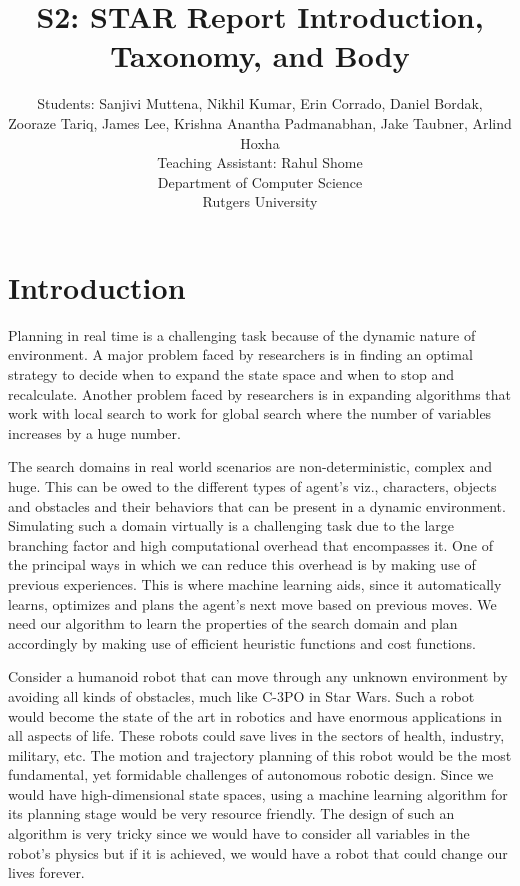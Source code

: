 \documentclass[tog]{acmsiggraph}
\title{S2: STAR Report Introduction, Taxonomy, and Body}
\author{Students: %
 Sanjivi Muttena\emailfoot{sanjivi.muttena@rutgers.edu}, %
 Nikhil Kumar\emailfoot{nikhilkumar516@gmail.com}, %
 Erin Corrado\emailfoot{e.corrado144@gmail.com}, %
 Daniel Bordak\emailfoot{dbordak@fastmail.fm},%
 \\Zooraze Tariq\emailfoot{zooraze@gmail.com}, %
 James Lee\emailfoot{yl50@scarletmail.rutgers.edu}, %
 Krishna Anantha Padmanabhan\emailfoot{krishna.ananth@rutgers.edu}, %
 Jake Taubner\emailfoot{jdt97@scarletmail.rutgers.edu}, %
 Arlind Hoxha\emailfoot{ah621@scarletmail.rutgers.edu}%
 \\Teaching Assistant: Rahul Shome\emailfoot{rahulshome.in@gmail.com}%
 \\Department of Computer Science%
 \\Rutgers University}
\begin{document}
\maketitle



\keywordlist{}
\setlength{\parskip}{0pt}
\setlength{\parindent}{10pt}

\section{Introduction}

Planning in real time is a challenging task because of the dynamic
nature of environment. A major problem faced by researchers is in
finding an optimal strategy to decide when to expand the state space
and when to stop and recalculate. Another problem faced by researchers
is in expanding algorithms that work with local search to work for
global search where the number of variables increases by a huge
number.

The search domains in real world scenarios are non-deterministic,
complex and huge. This can be owed to the different types of agent’s
viz., characters, objects and obstacles and their behaviors that can
be present in a dynamic environment. Simulating such a domain
virtually is a challenging task due to the large branching factor and
high computational overhead that encompasses it. One of the principal
ways in which we can reduce this overhead is by making use of previous
experiences. This is where machine learning aids, since it
automatically learns, optimizes and plans the agent’s next move based
on previous moves. We need our algorithm to learn the properties of
the search domain and plan accordingly by making use of efficient
heuristic functions and cost functions.

Consider a humanoid robot that can move through any unknown
environment by avoiding all kinds of obstacles, much like C-3PO in
Star Wars. Such a robot would become the state of the art in robotics
and have enormous applications in all aspects of life. These robots
could save lives in the sectors of health, industry, military, etc.
The motion and trajectory planning of this robot would be the most
fundamental, yet formidable challenges of autonomous robotic design.
Since we would have high-dimensional state spaces, using a machine
learning algorithm for its planning stage would be very resource
friendly. The design of such an algorithm is very tricky since we
would have to consider all variables in the robot’s physics but if it
is achieved, we would have a robot that could change our lives
forever.
\end{document}
